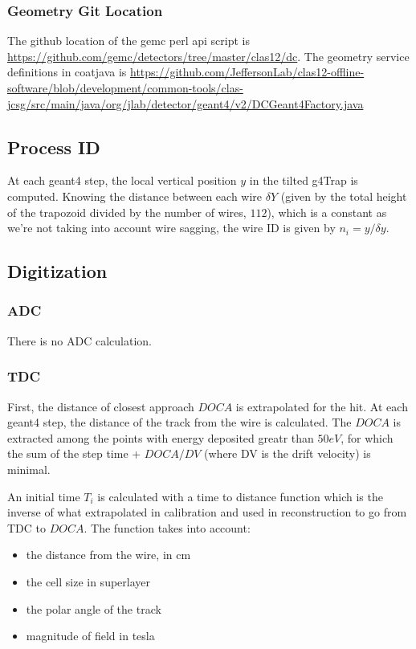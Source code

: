 \subsubsection{Geometry Git Location}
The github location of the gemc perl api script is \url{https://github.com/gemc/detectors/tree/master/clas12/dc}.
The geometry service definitions in coatjava is \url{https://github.com/JeffersonLab/clas12-offline-software/blob/development/common-tools/clas-jcsg/src/main/java/org/jlab/detector/geant4/v2/DCGeant4Factory.java}

\subsection{Process ID}
At each geant4 step, the local vertical position $y$ in the tilted g4Trap is computed. Knowing the distance
between each wire $\delta Y$ (given by the total height of the trapozoid divided by the number of wires, $112$), which is a constant as we're not taking into
account wire sagging, the wire ID is given by $n_i = y / \delta y$.

\subsection{Digitization}

\subsubsection{ADC}
There is no ADC calculation.

\subsubsection{TDC}
First, the distance of closest approach $DOCA$ is extrapolated for the hit. At each geant4 step, the distance of the track from the wire is calculated.
The $DOCA$ is extracted among the points with energy deposited greatr than $50 eV$, for which the sum of the step time + $DOCA / DV$ (where DV is the drift velocity) is minimal.

An initial time $T_i$ is calculated with a time to distance function which is the inverse of what extrapolated in calibration and used in reconstruction to go from TDC to $DOCA$.
The function takes into account:

\begin{itemize}
	\item the distance from the wire, in cm
	\item the cell size in superlayer
	\item the polar angle of the track
	\item magnitude of field in tesla
\end{itemize}

